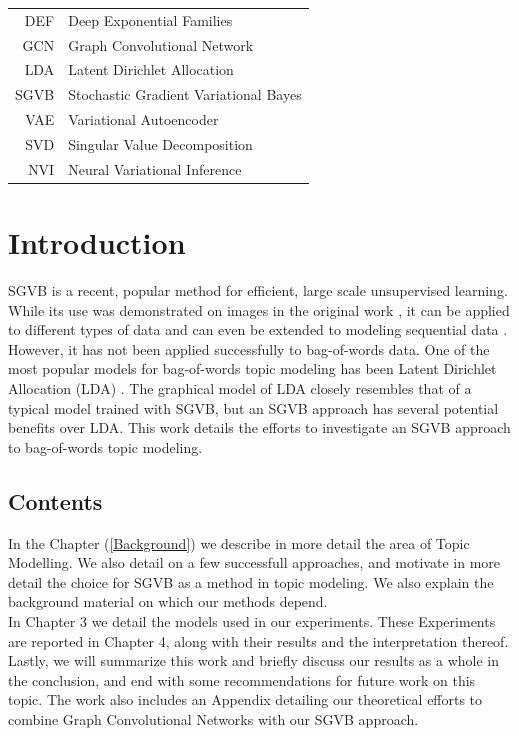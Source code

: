 \documentclass{report}
\begin{document}
\begin{tabular}{r l}
	\hspace{10mm} 
	DEF & Deep Exponential Families \\
	GCN & Graph Convolutional Network \\
	LDA & Latent Dirichlet Allocation \\
	SGVB & Stochastic Gradient Variational Bayes \\
	VAE & Variational Autoencoder \\
	SVD & Singular Value Decomposition \\
	NVI & Neural Variational Inference
\end{tabular}

\tableofcontents

\doublespacing

\chapter{Introduction}
SGVB \cite{kingma2013auto} \cite{rezende2014stochastic} is a recent, popular method for efficient, large scale unsupervised learning. While its use was demonstrated on images in the original work \cite{kingma2013auto} \cite{rezende2014stochastic}, it can be applied to different types of data and can even be extended to modeling sequential data \cite{chung2015recurrent} \cite{fabius2014variational}. \\
However, it has not been applied successfully to bag-of-words data. One of the most popular models for bag-of-words topic modeling has been Latent Dirichlet Allocation (LDA) \cite{blei2003latent}. The graphical model of LDA closely resembles that of a typical model trained with SGVB, but an SGVB approach has several potential benefits over LDA. This work details the efforts to investigate an SGVB approach to bag-of-words topic modeling.  \\

\section{Contents}
In the Chapter (\ref{Background}) we describe in more detail the area of Topic Modelling. We also detail on a few successfull approaches, and motivate in more detail the choice for SGVB as a method in topic modeling. We also explain the background material on which our methods depend. \\
In Chapter 3 we detail the models used in our experiments. These Experiments are reported in Chapter 4, along with their results and the interpretation thereof. Lastly, we will summarize this work and briefly discuss our results as a whole in the conclusion, and end with some recommendations for future work on this topic. The work also includes an Appendix detailing our theoretical efforts to combine Graph Convolutional Networks \cite{kipf2016semi} with our SGVB approach.
 
\end{document}
